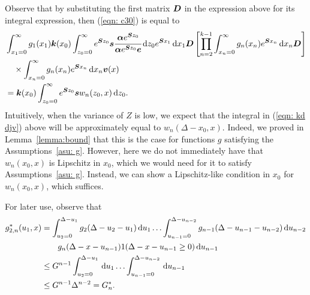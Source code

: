 	Observe that by substituting the first matrix \(\boldsymbol D\) in the expression above for its integral expression, then (\ref{eqn: c30}) is equal to 
	\begin{align}
		&\int_{x_1=0}^\infty g_1(x_1) \boldsymbol k(x_0) \int_{z_0=0}^\infty e^{\boldsymbol Sz_0}\boldsymbol s\cfrac{\boldsymbol\alpha e^{\boldsymbol Sz_0}}{\boldsymbol\alpha e^{\boldsymbol Sz_0}\boldsymbol e} \, \mathrm{d} z_0 e^{\boldsymbol{S}x_1}\, \mathrm{d} x_1\boldsymbol D 
            	\left[\prod_{n=2}^{k-1}\int_{x_n=0}^\infty g_n(x_n) e^{\boldsymbol{S}x_n} \, \mathrm{d} x_n
		\boldsymbol D\right]
            	\\\nonumber&\quad\times\int_{x_n=0}^\infty g_{n}(x_n) e^{\boldsymbol{S}x_n} \, \mathrm{d} x_n {\boldsymbol v}(x) 
		\\&=\boldsymbol k(x_0) \int_{z_0=0}^\infty e^{\boldsymbol Sz_0}\boldsymbol sw_n(z_0,x)\, \mathrm{d} z_0.\label{eqn: kd djv}
	\end{align}
	Intuitively, when the variance of \(Z\) is low, we expect that the integral in (\ref{eqn: kd djv}) above will be approximately equal to \(w_n(\Delta-x_0,x)\). Indeed, we proved in Lemma~\ref{lemma:bound} that this is the case for functions \(g\) satisfying the Assumptions~\ref{asu: g}. However, here we do not immediately have that \(w_n(x_0,x)\) is Lipschitz in \(x_0\), which we would need for it to satisfy Assumptions~\ref{asu: g}. Instead, we can show a Lipschitz-like condition in \(x_0\) for \(w_n(x_0,x)\), which suffices. 
	
For later use, observe that 
\begin{align}
	g^*_{2,n}(u_1,x) &= \int_{u_2=0}^{\Delta-u_1}g_2(\Delta - u_2 - u_1)\, \mathrm{d} u_1 \dots \nonumber 
         	\int_{u_{n-1}=0}^{\Delta-u_{n-2}} g_{n-1}(\Delta - u_{n-1} - u_{n-2}) \, \mathrm{d} u_{n-2}
       	\\&\qquad{}g_{n}(\Delta - x-u_{n-1})1(\Delta-x-u_{n-1}\geq0)\, \mathrm{d} u_{n-1} \nonumber
 	\\&\leq G^{n-1}\int_{u_2=0}^{\Delta-u_1}\, \mathrm{d} u_1 \dots\nonumber
            	\int_{u_{n-1}=0}^{\Delta-u_{n-2}}  \, \mathrm{d} u_{n-1}
		\\&\leq G^{n-1}\Delta^{n-2}=G^*_n.
\end{align}

